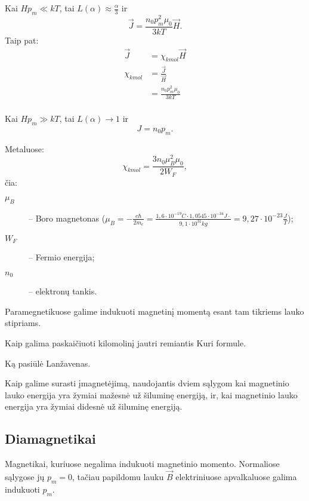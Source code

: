 Kai $Hp_{m} \ll kT$, tai $L(\alpha) \approx \frac{\alpha}{3}$ ir
\begin{equation*}
  \vec{J} = \frac{n_{0}p_{m}^{2}\mu_{0}}{3kT} \vec{H}.
\end{equation*}
Taip pat:
\begin{align*}
  \vec{J}
  &= \chi_{kmol}\vec{H} \\
  \chi_{kmol}
  &= \frac{\vec{J}}{\vec{H}} \\
  &= \frac{n_{0}p_{m}^{2}\mu_{0}}{3kT} \\
\end{align*}

Kai $Hp_{m} \gg kT$, tai $L(\alpha) \to 1$ ir
\begin{equation*}
  J = n_{0}p_{m}.
\end{equation*}

Metaluose:
\begin{equation*}
  \chi_{kmol} = \frac{3n_{0}\mu_{B}^{2}\mu_{0}}{2W_{F}},
\end{equation*}
čia:
\begin{description}
  \item[$\mu_{B}$] – Boro magnetonas
    ($\mu_{B} = -\frac{e\hbar}{2m_{e}} =%
    \frac{1,6\cdot10^{-19} C \cdot 1,0545\cdot10^{-34}J\cdot }%
    {9,1\cdot 10^{31} kg} = 9,27\cdot10^{-23} \frac{J}{T}$);
  \item[$W_{F}$] – Fermio energija;
  \item[$n_{0}$] – elektronų tankis.
\end{description}

\begin{remember}
  \item Paramegnetikuose galime indukuoti magnetinį momentą esant
    tam tikriems lauko stipriams.
  \item Kaip galima paskaičiuoti kilomolinį jautri remiantis Kuri
    formule.
  \item Ką pasiūlė Lanžavenas.
  \item Kaip galime surasti įmagnetėjimą, naudojantis dviem sąlygom
    kai magnetinio lauko energija yra žymiai mažesnė už šiluminę
    energiją, ir, kai magnetinio lauko energija yra žymiai didesnė
    už šiluminę energiją.
\end{remember}

\subsection{Diamagnetikai}

Magnetikai, kuriuose negalima indukuoti magnetinio momento. Normaliose
sąlygose jų $p_{m} = 0$, tačiau papildomu lauku $\vec{B}$ elektriniuose
apvalkaluose galima indukuoti $p_{m}$.

